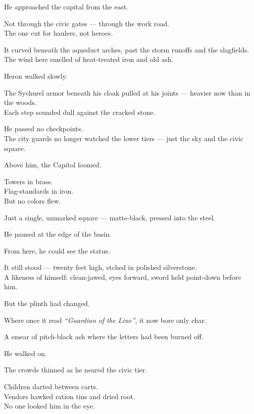 \documentclass[9pt]{article}
\begin{document}
He approached the capital from the east.

Not through the civic gates — through the work road.\\
The one cut for haulers, not heroes.

It curved beneath the aqueduct arches, past the storm runoffs and the slagfields.\\
The wind here smelled of heat-treated iron and old ash.

\vspace{1em}

Heron walked slowly.

The Sychurel armor beneath his cloak pulled at his joints — heavier now than in the woods.\\
Each step sounded dull against the cracked stone.

He passed no checkpoints.\\
The city guards no longer watched the lower tiers — just the sky and the civic square.

Above him, the Capitol loomed.

Towers in brass.\\
Flag-standards in iron.\\
But no colors flew.

Just a single, unmarked square — matte-black, pressed into the steel.

\vspace{1em}

He paused at the edge of the basin.

From here, he could see the statue.

It still stood — twenty feet high, etched in polished silverstone.\\
A likeness of himself: clean-jawed, eyes forward, sword held point-down before him.

But the plinth had changed.

Where once it read \textit{“Guardian of the Line”}, it now bore only char.

A smear of pitch-black ash where the letters had been burned off.

\vspace{1em}

He walked on.

The crowds thinned as he neared the civic tier.

Children darted between carts.\\
Vendors hawked ration tins and dried root.\\
No one looked him in the eye.
\end{document}
